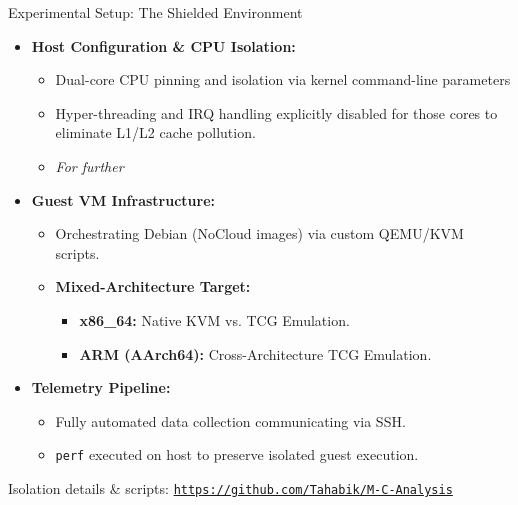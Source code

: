 \documentclass[aspectratio=169]{beamer} %
\begin{document}
\begin{frame}{Experimental Setup: The Shielded Environment}
      \begin{itemize}
          \item \textbf{Host Configuration \& CPU Isolation:}
          \begin{itemize}
              \item Dual-core CPU pinning and isolation via kernel command-line parameters
              \item Hyper-threading and IRQ handling explicitly disabled for those cores to eliminate L1/L2 cache pollution.
              \item \textit{For further}
          \end{itemize}
          
          \vspace{0.4cm}
          \item \textbf{Guest VM Infrastructure:}
          \begin{itemize}
              \item Orchestrating Debian (NoCloud images) via custom QEMU/KVM scripts.
              \item \textbf{Mixed-Architecture Target:}
              \begin{itemize}
                  \item \textbf{x86\_64:} Native KVM vs. TCG Emulation.
                  \item \textbf{ARM (AArch64):} Cross-Architecture TCG Emulation.
              \end{itemize}
          \end{itemize}

          \vspace{0.4cm}
          \item \textbf{Telemetry Pipeline:}
          \begin{itemize}
              \item Fully automated data collection communicating via SSH.
              \item \texttt{perf} executed on host to preserve isolated guest execution.
          \end{itemize}
      \end{itemize}

      \vfill
      \begin{flushleft}
          \scriptsize Isolation details \& scripts: \href{https://github.com/Tahabik/M-C-Analysis}{\texttt{https://github.com/Tahabik/M-C-Analysis}}
      \end{flushleft}
  \end{frame}
\end{document}
